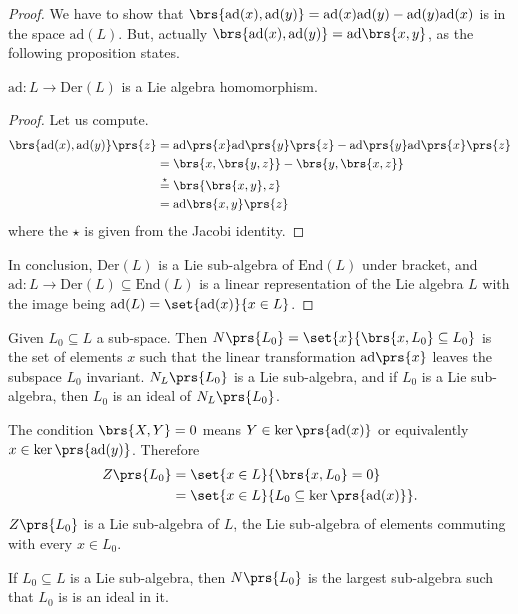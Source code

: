 \documentclass[10pt,a4paper,twoside,openany,hidelinks]{book}
\begin{document}
\begin{proof}
We have to show that $\brs{\mathrm{ad}(x),\mathrm{ad}(y)} = \mathrm{ad}(x)\mathrm{ad}(y) - \mathrm{ad}(y)\mathrm{ad}(x)$ is in the space $\mathrm{ad}(L)$. But, actually $\brs{\mathrm{ad}(x), \mathrm{ad}(y)} = \mathrm{ad}\brs{x,y}$, as the following proposition states.
\begin{proposition}
$\mathrm{ad} \colon L \to \mathrm{Der}(L)$
is a Lie algebra homomorphism.
\end{proposition}
\begin{proof}
Let us compute.
\begin{align*}
\brs{\mathrm{ad}(x), \mathrm{ad}(y)}\prs{z} &= \mathrm{ad}\prs{x} \mathrm{ad}\prs{y}\prs{z} - \mathrm{ad}\prs{y}\mathrm{ad}\prs{x}\prs{z} \\
&= \brs{x,\brs{y,z}} - \brs{y,\brs{x,z}} \\
&\stackrel{\star}{=} \brs{\brs{x,y},z} \\
&= \mathrm{ad}\brs{x,y}\prs{z}
\end{align*}
where the $\star$ is given from the Jacobi identity.
\end{proof}
In conclusion, $\mathrm{Der}(L)$ is a Lie sub-algebra of $\mathrm{End}(L)$ under bracket, and $\mathrm{ad} \colon L \to \mathrm{Der}(L) \subseteq \mathrm{End}(L)$ is a linear representation of the Lie algebra $L$ with the image being $\mathrm{ad}(L) = \set{\mathrm{ad}(x)}{x \in L}$.
\end{proof}
\begin{example}
Given $L_0 \subseteq L$ a sub-space. Then
$N\prs{L_0} = \set{x}{\brs{x,L_0} \subseteq L_0}$ is the set of elements $x$ such that the linear transformation $\mathrm{ad}\prs{x}$ leaves the subspace $L_0$ invariant. $N_L\prs{L_0}$ is a Lie sub-algebra, and if $L_0$ is a Lie sub-algebra, then $L_0$ is an ideal of $N_L\prs{L_0}$.
\end{example}
\begin{example}
The condition $\brs{X,Y} = 0$ means $Y \in \ker\prs{\mathrm{ad}(x)}$ or equivalently $x \in \ker\prs{\mathrm{ad}(y)}$. Therefore
\begin{align*}
Z\prs{L_0} &= \set{x \in L}{\brs{x,L_0} = 0} \\
&= \set{x \in L}{L_0 \subseteq \ker\prs{\mathrm{ad}(x)}} \text{.}
\end{align*}
$Z\prs{L_0}$ is a Lie sub-algebra of $L$, the Lie sub-algebra of elements commuting with every $x \in L_0$.
\end{example}
\begin{remark}
If $L_0 \subseteq L$ is a Lie sub-algebra, then $N\prs{L_0}$ is the largest sub-algebra such that $L_0$ is is an ideal in it.
\end{remark}
\end{document}
